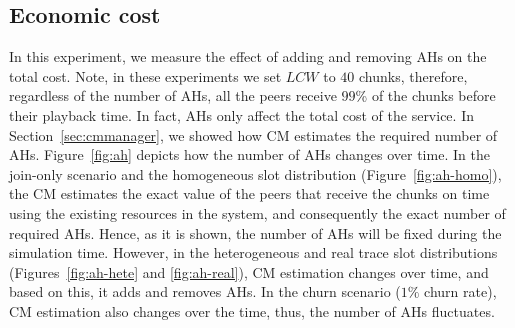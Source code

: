 {\subsection{Economic cost}
In this experiment, we measure the effect of adding and removing AHs on the
total cost. Note, in these experiments we set $LCW$ to $40$ chunks, therefore,
regardless of the number of AHs, all the peers receive $99$\% of the chunks
before their playback time. In fact, AHs only affect the total cost of the
service. In Section~\ref{sec:cmmanager}, we showed how CM estimates the
required number of AHs. Figure~\ref{fig:ah} depicts how the number of AHs
changes over time. In the join-only scenario and the homogeneous slot
distribution (Figure~\ref{fig:ah-homo}), the CM estimates the exact value of
the peers that receive the chunks on time using the existing resources in the
system, and consequently the exact number of required AHs. Hence, as it is
shown, the number of AHs will be fixed during the simulation time. However, in
the heterogeneous and real trace slot distributions (Figures~\ref{fig:ah-hete}
and \ref{fig:ah-real}), CM estimation changes over time, and based on this, it
adds and removes AHs. In the churn scenario ($1\%$ churn rate), CM estimation
also changes over the time, thus, the number of AHs fluctuates.

}
